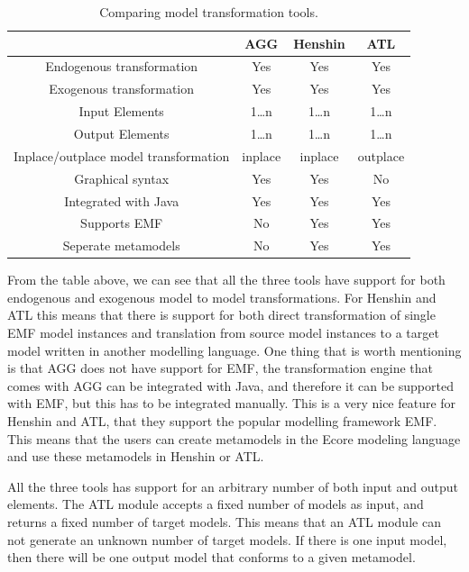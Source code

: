 \documentclass[pdftex,11pt,a4paper]{article}
\begin{document}
\begin{table}[ht]
\centering
\begin{tabular}{| c | c | c | c |}
\hline
 & AGG & Henshin & ATL \\
\hline
Endogenous transformation & \cellcolor{green!25}Yes &
\cellcolor{green!25}Yes & \cellcolor{green!25}Yes \\

Exogenous transformation & \cellcolor{green!25}Yes &
\cellcolor{green!25}Yes & \cellcolor{green!25}Yes \\

Input Elements & 1\ldots n & 1\ldots n & 1\ldots n\\
Output Elements & 1\ldots n & 1\ldots n & 1\ldots n\\
Inplace/outplace model transformation &inplace &
inplace &outplace \\
Graphical syntax &\cellcolor{green!25}Yes &
\cellcolor{green!25}Yes &\cellcolor{red!25}No  \\
Integrated with Java & \cellcolor{green!25}Yes &
\cellcolor{green!25}Yes & \cellcolor{green!25}Yes \\
Supports EMF & \cellcolor{red!25}No &
\cellcolor{green!25}Yes & \cellcolor{green!25}Yes \\
Seperate metamodels & \cellcolor{red!25}No &
\cellcolor{green!25}Yes & \cellcolor{green!25}Yes \\
\hline

\end{tabular}
\caption{Comparing model transformation tools.}
\end{table}

From the table above, we can see that all the three tools have support for both
endogenous and exogenous model to model transformations. For Henshin and ATL
this means that there is support for both direct transformation of single EMF
model instances and translation from source model instances to a target model
written in another modelling language. One thing that is worth mentioning is
that AGG does not have support for EMF, the transformation engine that comes
with AGG can be integrated with Java, and therefore it can be supported with
EMF, but this has to be integrated manually. This is a very nice feature for
Henshin and ATL, that they support the popular modelling framework EMF. This
means that the users can create metamodels in the Ecore modeling language and
use these metamodels in Henshin or ATL. 

All the three tools has support for an arbitrary number of both input and output
elements. The ATL module accepts a fixed number of models as input, and returns
a fixed number of target models. This means that an ATL module can not generate
an unknown number of target models. If there is one input model, then there
will be one output model that conforms to a given metamodel.
\end{document}
